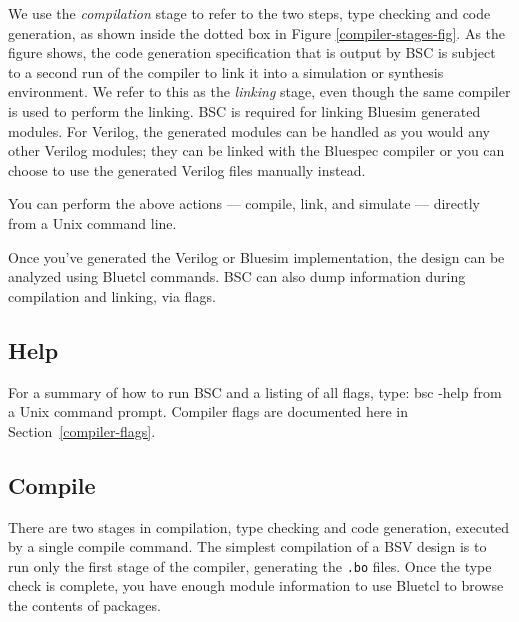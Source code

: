 \documentclass{article}
\newcommand{\te}[1]{\texttt{#1}}
\newenvironment{centerboxverbatim}
  {\center
   \boxedverbatim}
  {\endboxedverbatim
  {\endcenter }}
\begin{document}
We  use the {\em compilation} stage to refer
to the two steps, type checking  and code generation, as shown inside
the dotted box in Figure \ref{compiler-stages-fig}. As the figure
shows, the  code generation specification that is output
by BSC is subject to a second run of the compiler to link
it into a simulation or synthesis environment.  We  refer to this
as the 
{\em linking} stage, even though the same compiler is used to perform
the linking.
BSC is required for
linking Bluesim generated modules.  For Verilog, the generated modules
can be handled as you would any other Verilog modules; they can be
linked with the Bluespec compiler or  you can choose to use the
generated Verilog files manually instead.

You can perform the above actions --- compile, link, and simulate ---
directly from a Unix command line.

Once you've generated the Verilog or Bluesim implementation, the
design can be analyzed using Bluetcl commands.  BSC can also dump
information during compilation and linking, via flags.


\subsection{Help}

For a summary of how to run BSC and a listing of all flags, type:
\begin{centerboxverbatim}
bsc -help
\end{centerboxverbatim}
from a Unix command prompt.
Compiler flags are documented here in Section~\ref{compiler-flags}.


\subsection{Compile}
\label{sec-compile}
\index{.bo@\te{.bo}}
\index{.ba@\te{.ba}}
\index{.v@\te{.v}}

There are two stages in compilation, type checking and
code generation, executed by a single compile command.
The simplest compilation of a BSV design is to run only the first
stage of the compiler, generating the \te{.bo} files.
Once the type check is complete, you have enough module
information to use Bluetcl to browse the contents of packages.
\end{document}
